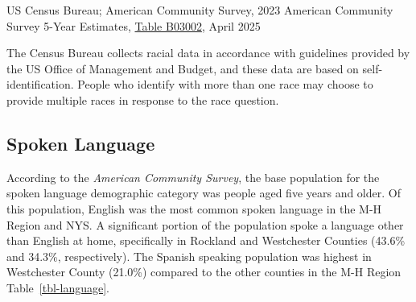 \documentclass[
  english,
  letterpaper,
]{report}
\begin{document}
\begin{longtable}[]{@{}lllllllllllllll@{}}
\end{longtable}

\begin{tcolorbox}[enhanced jigsaw, breakable, leftrule=.75mm, title=\textcolor{quarto-callout-note-color}{\faInfo}\hspace{0.5em}{Source}, bottomrule=.15mm, opacityback=0, left=2mm, colback=white, bottomtitle=1mm, coltitle=black, colbacktitle=quarto-callout-note-color!10!white, colframe=quarto-callout-note-color-frame, opacitybacktitle=0.6, toptitle=1mm, titlerule=0mm, arc=.35mm, rightrule=.15mm, toprule=.15mm]

US Census Bureau; American Community Survey, 2023 American Community
Survey 5-Year Estimates,
\href{https://data.census.gov/table/ACSDT5Y2023.B03002?q=b03002&g=050XX00US36105,36027,36071,36119,36087,36079,36111_160XX00US3651000_040XX00US36}{Table
B03002}, April 2025

\end{tcolorbox}

\begin{tcolorbox}[enhanced jigsaw, breakable, leftrule=.75mm, title=\textcolor{quarto-callout-note-color}{\faInfo}\hspace{0.5em}{Note}, bottomrule=.15mm, opacityback=0, left=2mm, colback=white, bottomtitle=1mm, coltitle=black, colbacktitle=quarto-callout-note-color!10!white, colframe=quarto-callout-note-color-frame, opacitybacktitle=0.6, toptitle=1mm, titlerule=0mm, arc=.35mm, rightrule=.15mm, toprule=.15mm]

The Census Bureau collects racial data in accordance with guidelines
provided by the US Office of Management and Budget, and these data are
based on self-identification. People who identify with more than one
race may choose to provide multiple races in response to the race
question.

\end{tcolorbox}

\subsection{Spoken Language}\label{spoken-language}

According to the \emph{American Community Survey}, the base population
for the spoken language demographic category was people aged five years
and older. Of this population, English was the most common spoken
language in the M-H Region and NYS. A significant portion of the
population spoke a language other than English at home, specifically in
Rockland and Westchester Counties (43.6\% and 34.3\%, respectively). The
Spanish speaking population was highest in Westchester County (21.0\%)
compared to the other counties in the M-H Region
Table~\ref{tbl-language}.
\end{document}
